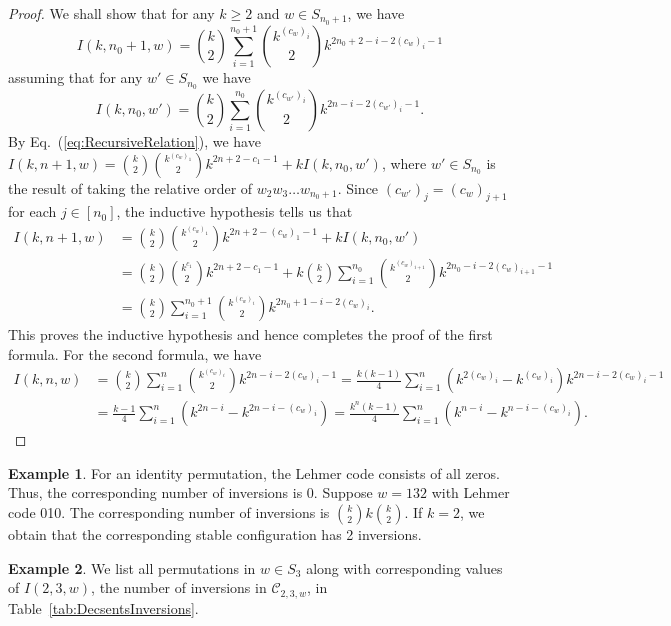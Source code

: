 \documentclass[final]{dmtcs-episciences}
\theoremstyle{definition}
\newtheorem{example}{Example}
\theoremstyle{remark}
\begin{document}
\begin{proof}
We shall show that for any $k \geq 2$ and $w \in S_{n_0+1}$, we have
\[I(k, n_0+1, w) = \binom{k}{2} \sum_{i=1}^{n_0+1} \binom{k^{(c_w)_i}}{2}k^{2n_0+2-i-2(c_w)_i-1}\]
assuming that for any $w' \in S_{n_0}$ we have $$I(k, n_0, w') = \binom{k}{2} \sum_{i=1}^{n_0}\binom{k^{(c_{w'})_{i}} }{ 2}k^{2n-i-2(c_{w'})_i-1}.$$
By Eq.~(\ref{eq:RecursiveRelation}), we have $I(k, n+1, w) = \binom{k}{2}\binom{k^{(c_w)_1}}{2}k^{2n+2-c_1-1} + k I(k, n_0, w')$, where $w' \in S_{n_0} $ is the result of taking the relative order of $w_2w_3\dots w_{n_0+1}$. Since $(c_{w'})_{j} = (c_{w})_{j+1}$ for each $j \in [n_0]$, the inductive hypothesis tells us that \begin{equation*}
    \begin{split}
        I(k, n+1, w) &= \binom{k}{2}\binom{k^{(c_w)_1}}{2}k^{2n+2-(c_w)_1-1} + k I(k, n_0, w') \\ &= \binom{k}{2}\binom{k^{c_1}}{2}k^{2n+2-c_1-1} +k \binom{k}{2}\sum_{i=1}^{n_0} \binom{k^{(c_{w})_{i+1}}}{2} k^{2n_0 - i-2(c_w)_{i+1}-1} \\ &= \binom{k}{2}\sum_{i=1}^{n_0+1}\binom{k^{(c_w)_i}}{2}k^{2n_0+1-i-2(c_w)_{i}}.
    \end{split}
\end{equation*} This proves the inductive hypothesis and hence completes the proof of the first formula.
For the second formula, we have
\begin{equation*}
\begin{split}
I(k, n, w) &= \binom{k}{2}\sum_{i=1}^n\binom{k^{(c_w)_i}}{2}k^{2n-i-2(c_w)_i-1} = \frac{k(k-1)}{4}\sum_{i=1}^n (k^{2(c_w)_i}-k^{(c_w)_i})k^{2n-i-2(c_w)_i-1} \\
&= \frac{k-1}{4}\sum_{i=1}^n (k^{2n-i}-k^{2n-i-(c_w)_i}) = \frac{k^n(k-1)}{4}\sum_{i=1}^n(k^{n-i} -k^{n-i-(c_w)_i}).
\end{split}
\end{equation*}\end{proof}

\begin{example}
For an identity permutation, the Lehmer code consists of all zeros. Thus, the corresponding number of inversions is 0.
    Suppose $w=132$ with Lehmer code 010. The corresponding number of inversions is $\binom{k}{2} k \binom{k}{2}$. If $k=2$, we obtain that the corresponding stable configuration has 2 inversions.
\end{example}

\begin{example}
    We list all permutations in $w \in S_3$ along with corresponding values of $I(2, 3, w)$, the number of inversions in $\mathcal{C}_{2, 3, w}$, in Table~\ref{tab:DecsentsInversions}.
\end{example}
\end{document}
